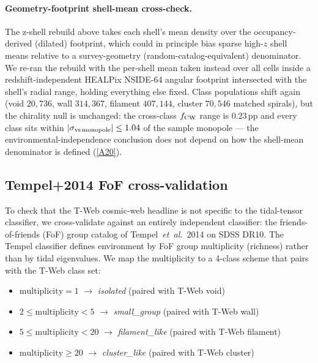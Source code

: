 \documentclass[aps,prd,twocolumn,superscriptaddress,showpacs,preprintnumbers,nofootinbib,longbibliography,floatfix]{revtex4-2}
\newcommand{\repoBase}{https://github.com/Hubify-Projects/bigbounce/blob/main}
\begin{document}
\paragraph{Geometry-footprint shell-mean cross-check.} The z-shell
rebuild above takes each shell's mean density over the
occupancy-derived (dilated) footprint, which could in principle bias
sparse high-$z$ shell means relative to a survey-geometry
(random-catalog-equivalent) denominator. We re-ran the rebuild with
the per-shell mean taken instead over all cells inside a
redshift-independent HEALPix NSIDE-64 angular footprint intersected
with the shell's radial range, holding everything else fixed. Class
populations shift again (void $20{,}736$, wall $314{,}367$, filament
$407{,}144$, cluster $70{,}546$ matched spirals), but the chirality
null is unchanged: the cross-class $f_{\rm CW}$ range is
$0.23$\,pp and every class sits within $|\sigma_{\rm vs\,monopole}|
\le 1.04$ of the sample monopole — the environmental-independence
conclusion does not depend on how the shell-mean denominator is
defined
(\href{\repoBase/pipelines/p5\_desi\_chirality/outputs/19\_v0151\_zshell\_geofootprint\_check.json}{[A20]}).

\subsection{Tempel+2014 FoF cross-validation}\label{sec:tempel}

To check that the T-Web cosmic-web headline is not specific to the
tidal-tensor classifier, we cross-validate against an entirely
independent classifier: the friends-of-friends (FoF) group catalog of
Tempel~\textit{et~al.}~2014 \cite{Tempel2014} on SDSS DR10. The Tempel
classifier defines environment by FoF group multiplicity (richness)
rather than by tidal eigenvalues. We map the multiplicity to a 4-class
scheme that pairs with the T-Web class set:

\begin{itemize}
\item $\mathrm{multiplicity}\!=\!1$ $\to$ \emph{isolated} (paired with T-Web void)
\item $2 \le \mathrm{multiplicity} < 5$ $\to$ \emph{small\_group} (paired with T-Web wall)
\item $5 \le \mathrm{multiplicity} < 20$ $\to$ \emph{filament\_like} (paired with T-Web filament)
\item $\mathrm{multiplicity} \ge 20$ $\to$ \emph{cluster\_like} (paired with T-Web cluster)
\end{itemize}
\end{document}
